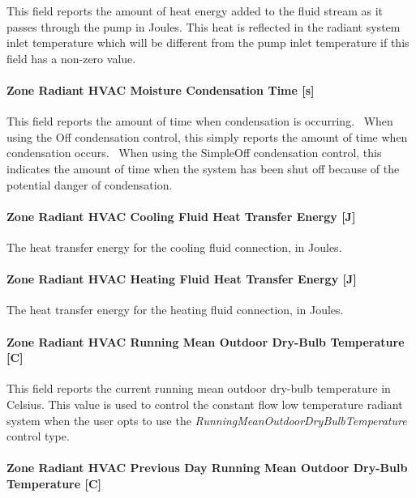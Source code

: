 This field reports the amount of heat energy added to the fluid stream as it passes through the pump in Joules. This heat is reflected in the radiant system inlet temperature which will be different from the pump inlet temperature if this field has a non-zero value.

\paragraph{Zone Radiant HVAC Moisture Condensation Time {[}s{]}}\label{zone-radiant-hvac-moisture-condensation-time-s}

This field reports the amount of time when condensation is occurring.~ When using the Off condensation control, this simply reports the amount of time when condensation occurs.~ When using the SimpleOff condensation control, this indicates the amount of time when the system has been shut off because of the potential danger of condensation.

\paragraph{Zone Radiant HVAC Cooling Fluid Heat Transfer Energy {[}J{]}}\label{zone-radiant-hvac-cooling-fluid-heat-transfer-energy-j}

The heat transfer energy for the cooling fluid connection, in Joules.

\paragraph{Zone Radiant HVAC Heating Fluid Heat Transfer Energy {[}J{]}}\label{zone-radiant-hvac-heating-fluid-heat-transfer-energy-j}

The heat transfer energy for the heating fluid connection, in Joules.

\paragraph{Zone Radiant HVAC Running Mean Outdoor Dry-Bulb Temperature {[}C{]}}\label{zone-radiant-hvac-running-mean-outdoor-dry-bulb-temperature-1}

This field reports the current running mean outdoor dry-bulb temperature in Celsius. This value is used to control the constant flow low temperature radiant system when the user opts to use the \emph{RunningMeanOutdoorDryBulbTemperature} control type.

\paragraph{Zone Radiant HVAC Previous Day Running Mean Outdoor Dry-Bulb Temperature {[}C{]}}\label{zone-radiant-hvac-previous-day-running-mean-outdoor-dry-bulb-temperature}

